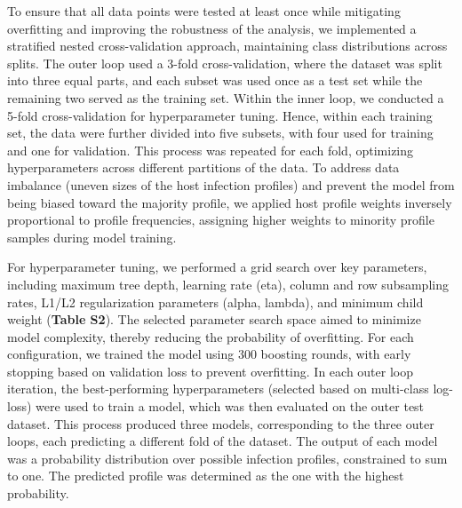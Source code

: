 \documentclass[oneside, a4paper, onecolumn, 11pt]{article}
\begin{document}
To ensure that all data points were tested at least once while mitigating overfitting and improving the robustness of the analysis, we implemented a stratified nested cross-validation approach, maintaining class distributions across splits. The outer loop used a 3-fold cross-validation, where the dataset was split into three equal parts, and each subset was used once as a test set while the remaining two served as the training set. Within the inner loop, we conducted a 5-fold cross-validation for hyperparameter tuning. Hence, within each training set, the data were further divided into five subsets, with four used for training and one for validation. This process was repeated for each fold, optimizing hyperparameters across different partitions of the data. To address data imbalance (uneven sizes of the host infection profiles) and prevent the model from being biased toward the majority profile, we applied host profile weights inversely proportional to profile frequencies, assigning higher weights to minority profile samples during model training.

For hyperparameter tuning, we performed a grid search over key parameters, including maximum tree depth, learning rate (eta), column and row subsampling rates, L1/L2 regularization parameters (alpha, lambda), and minimum child weight (\textbf{Table S2}). The selected parameter search space aimed to minimize model complexity, thereby reducing the probability of overfitting. For each configuration, we trained the model using 300 boosting rounds, with early stopping based on validation loss to prevent overfitting. In each outer loop iteration, the best-performing hyperparameters (selected based on multi-class log-loss) were used to train a model, which was then evaluated on the outer test dataset. This process produced three models, corresponding to the three outer loops, each predicting a different fold of the dataset. The output of each model was a probability distribution over possible infection profiles, constrained to sum to one. The predicted profile was determined as the one with the highest probability.
\end{document}
